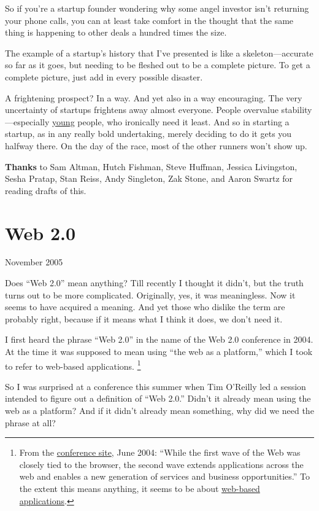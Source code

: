 \documentclass[12pt]{book}
\begin{document}
So if you're a startup founder wondering why some angel investor isn't
returning your phone calls, you can at least take comfort in the thought
that the same thing is happening to other deals a hundred times the
size.

The example of a startup's history that I've presented is like a
skeleton---accurate so far as it goes, but needing to be fleshed out to
be a complete picture. To get a complete picture, just add in every
possible disaster.

A frightening prospect? In a way. And yet also in a way encouraging. The
very uncertainty of startups frightens away almost everyone. People
overvalue stability---especially \href{hiring.html}{young} people, who
ironically need it least. And so in starting a startup, as in any really
bold undertaking, merely deciding to do it gets you halfway there. On
the day of the race, most of the other runners won't show up.


\textbf{Thanks} to Sam Altman, Hutch Fishman, Steve Huffman, Jessica
Livingston, Sesha Pratap, Stan Reiss, Andy Singleton, Zak Stone, and
Aaron Swartz for reading drafts of this.
\chapter{Web 2.0}

November 2005

Does ``Web 2.0'' mean anything? Till recently I thought it didn't, but
the truth turns out to be more complicated. Originally, yes, it was
meaningless. Now it seems to have acquired a meaning. And yet those who
dislike the term are probably right, because if it means what I think it
does, we don't need it.

I first heard the phrase ``Web 2.0'' in the name of the Web 2.0
conference in 2004. At the time it was supposed to mean using ``the web
as a platform,'' which I took to refer to web-based applications.
\footnote{From the
\href{http://web.archive.org/web/20040602111547/http://web2con.com/}{conference
site}, June 2004: ``While the first wave of the Web was closely tied to
the browser, the second wave extends applications across the web and
enables a new generation of services and business opportunities.'' To
the extent this means anything, it seems to be about
\href{road.html}{web-based applications}.}

So I was surprised at a conference this summer when Tim O'Reilly led a
session intended to figure out a definition of ``Web 2.0.'' Didn't it
already mean using the web as a platform? And if it didn't already mean
something, why did we need the phrase at all?
\end{document}
